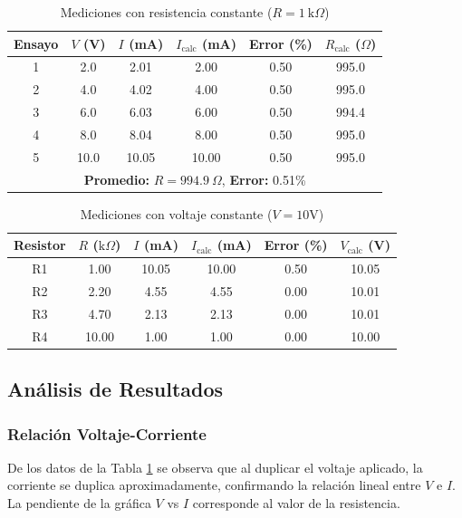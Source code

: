 \documentclass[12pt]{article}
\begin{document}
\begin{table}[h]
    \centering
    \caption{Mediciones con resistencia constante ($R = 1\ \text{k}\Omega$)}
    \label{tab:datos_Rconstante}
    \begin{tabular}{@{}cccccc@{}}
        \toprule
        \textbf{Ensayo} & \textbf{$V$ (V)} & \textbf{$I$ (mA)} & \textbf{$I_{\text{calc}}$ (mA)} & \textbf{Error (\%)} & \textbf{$R_{\text{calc}}$ ($\Omega$)} \\
        \midrule
        1 & 2.0 & 2.01 & 2.00 & 0.50 & 995.0 \\
        2 & 4.0 & 4.02 & 4.00 & 0.50 & 995.0 \\
        3 & 6.0 & 6.03 & 6.00 & 0.50 & 994.4 \\
        4 & 8.0 & 8.04 & 8.00 & 0.50 & 995.0 \\
        5 & 10.0 & 10.05 & 10.00 & 0.50 & 995.0 \\
        \midrule
        \multicolumn{6}{c}{\textbf{Promedio: } $R = 994.9\ \Omega$, \textbf{Error: } 0.51\%} \\
        \bottomrule
    \end{tabular}
\end{table}

\begin{table}[h]
    \centering
    \caption{Mediciones con voltaje constante ($V = 10$V)}
    \label{tab:datos_Vconstante}
    \begin{tabular}{@{}cccccc@{}}
        \toprule
        \textbf{Resistor} & \textbf{$R$ ($\text{k}\Omega$)} & \textbf{$I$ (mA)} & \textbf{$I_{\text{calc}}$ (mA)} & \textbf{Error (\%)} & \textbf{$V_{\text{calc}}$ (V)} \\
        \midrule
        R1 & 1.00 & 10.05 & 10.00 & 0.50 & 10.05 \\
        R2 & 2.20 & 4.55 & 4.55 & 0.00 & 10.01 \\
        R3 & 4.70 & 2.13 & 2.13 & 0.00 & 10.01 \\
        R4 & 10.00 & 1.00 & 1.00 & 0.00 & 10.00 \\
        \bottomrule
    \end{tabular}
\end{table}

\subsection{Análisis de Resultados}

\subsubsection{Relación Voltaje-Corriente}
De los datos de la Tabla \ref{tab:datos_Rconstante} se observa que al duplicar el voltaje aplicado, la corriente se duplica aproximadamente, confirmando la relación lineal entre $V$ e $I$. La pendiente de la gráfica $V$ vs $I$ corresponde al valor de la resistencia.
\end{document}

